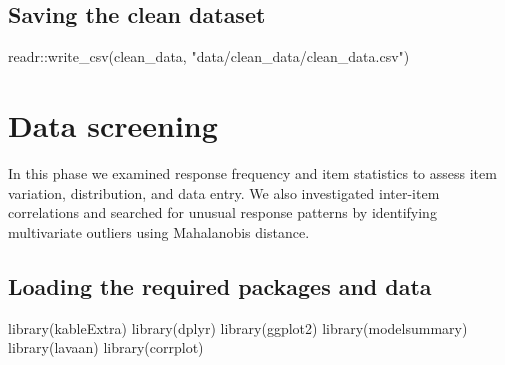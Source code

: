 \documentclass[
  letterpaper,
  DIV=11,
  numbers=noendperiod]{scrreprt}
\newenvironment{Shaded}{\begin{snugshade}}{\end{snugshade}}
\newcommand{\FunctionTok}[1]{\textcolor[rgb]{0.28,0.35,0.67}{#1}}
\newcommand{\NormalTok}[1]{\textcolor[rgb]{0.00,0.23,0.31}{#1}}
\newcommand{\SpecialCharTok}[1]{\textcolor[rgb]{0.37,0.37,0.37}{#1}}
\newcommand{\StringTok}[1]{\textcolor[rgb]{0.13,0.47,0.30}{#1}}
\begin{document}
\hypertarget{saving-the-clean-dataset}{%
\section{Saving the clean dataset}\label{saving-the-clean-dataset}}

\begin{Shaded}
\begin{Highlighting}[]
\NormalTok{readr}\SpecialCharTok{::}\FunctionTok{write\_csv}\NormalTok{(clean\_data, }\StringTok{"data/clean\_data/clean\_data.csv"}\NormalTok{)}
\end{Highlighting}
\end{Shaded}


\hypertarget{data-screening}{%
\chapter{Data screening}\label{data-screening}}

In this phase we examined response frequency and item statistics to
assess item variation, distribution, and data entry. We also
investigated inter-item correlations and searched for unusual response
patterns by identifying multivariate outliers using Mahalanobis
distance.

\hypertarget{loading-the-required-packages-and-data}{%
\section{Loading the required packages and
data}\label{loading-the-required-packages-and-data}}

\begin{Shaded}
\begin{Highlighting}[]
\FunctionTok{library}\NormalTok{(kableExtra)}
\FunctionTok{library}\NormalTok{(dplyr)}
\FunctionTok{library}\NormalTok{(ggplot2)}
\FunctionTok{library}\NormalTok{(modelsummary)}
\FunctionTok{library}\NormalTok{(lavaan)}
\FunctionTok{library}\NormalTok{(corrplot)}
\end{Highlighting}
\end{Shaded}
\end{document}
